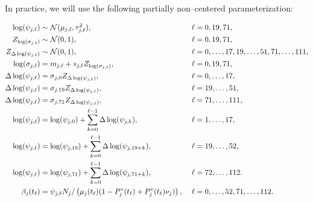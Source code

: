 In practice, we will use the following partially non--centered parameterization:
\begin{small}
	\begin{align}
	\log(\psi_{j,\ell}) &\sim \mcN(\mu_{j,\ell},\tau_{j,\ell}^2),&\ &\ell= 0,19,71, \nonumber\\
	Z_{\log(\sigma_{j,\ell})} &\sim \mcN(0,1),&\ &\ell=0,19,71, \nonumber \\
	Z_{\Delta\log(\psi_{j,\ell})} &\sim \mcN(0,1),&\ &\ell=0,\dots,17,19,\dots,51,71,\dots,111, \nonumber \\ 
	\log(\sigma_{j,\ell}) &= m_{j,\ell} + s_{j,\ell}Z_{\log(\sigma_{j,\ell})},&\ &\ell = 0,19,71,\nonumber\\
	\Delta\log(\psi_{j,\ell})&= \sigma_{j,0} Z_{\Delta\log(\psi_{j,\ell})},&\ &\ell=0,\dots,17, \nonumber\\
	\Delta\log(\psi_{j,\ell})&= \sigma_{j,19} Z_{\Delta\log(\psi_{j,\ell})},&\ &\ell=19,\dots,51, \nonumber\\
	\Delta\log(\psi_{j,\ell})&= \sigma_{j,71} Z_{\Delta\log(\psi_{j,\ell})},&\ &\ell=71,\dots,111, \nonumber\\
	\log(\psi_{j,\ell}) &= \log(\psi_{j,0}) + \sum_{k=0}^{\ell-1}\Delta\log(\psi_{j,k}),&\ &\ell = 1,\dots,17, \nonumber\\
	\log(\psi_{j,\ell}) &= \log(\psi_{j,19}) + \sum_{k=0}^{\ell-1}\Delta\log(\psi_{j,19+k}),&\ &\ell = 19,\dots,52, \nonumber\\
	\log(\psi_{j,\ell}) &= \log(\psi_{j,71}) + \sum_{k=0}^{\ell-1}\Delta\log(\psi_{j,71+k}),&\ &\ell = 72,\dots,112. \nonumber \\
	\beta_j(t_\ell) &= \psi_{j,\ell}N_j/\left (\mu_{j}(t_\ell)(1 - P^v_j(t_\ell) + P_j^v(t_\ell)\nu_j)\right ),&\ &\ell=0,\dots,52,71,\dots,112. \nonumber
	\end{align}
\end{small}

